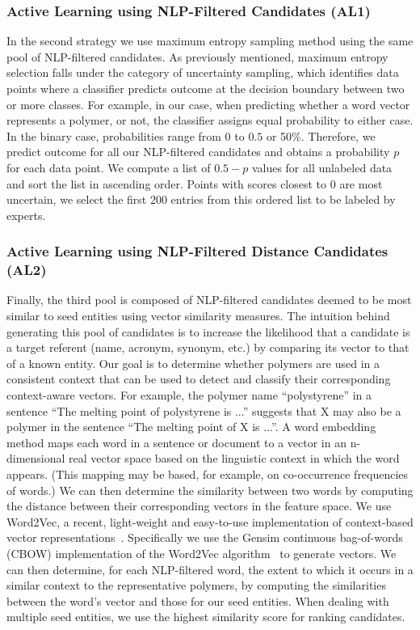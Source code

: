 \subsubsection{Active Learning using NLP-Filtered Candidates (AL1)}
In the second strategy we use maximum entropy sampling method using the same pool of NLP-filtered candidates.
As previously mentioned, maximum entropy selection falls under the category of uncertainty sampling, which identifies data points where a classifier predicts outcome at the decision boundary between two or more classes. 
For example, in our case, when predicting whether a word vector represents a polymer, or not, the classifier assigns equal probability to either case.
In the binary case, probabilities range from $0$ to $0.5$ or 50\%. Therefore, we predict outcome for all our NLP-filtered candidates and obtains a probability $p$ for each data point. We compute a list of $0.5-p$ values for all unlabeled data and sort the list in ascending order.
Points with scores closest to $0$ are most uncertain, we select the first 200 entries from this ordered list to be labeled by experts.


\subsubsection{Active Learning using NLP-Filtered Distance Candidates (AL2)}
Finally, the third pool is composed of NLP-filtered candidates deemed to be most similar to seed entities using vector similarity measures.
The intuition behind generating this pool of candidates is to increase the likelihood that a candidate is a target referent (name, acronym, synonym, etc.) by comparing its vector to that of a known entity.
Our goal is to determine whether polymers are used in a consistent context that can be used to detect and classify their corresponding context-aware vectors.
For example, the polymer name ``polystyrene'' in a sentence ``The
melting point of polystyrene is ...'' suggests that X may also be a polymer in the
sentence ``The melting point of X is ...''.
A word embedding method maps each word
in a sentence or document to a vector in an n-dimensional real vector space
based on the linguistic context in which the word appears. (This mapping may
be based, for example, on co-occurrence frequencies of words.) 
We can then
determine the similarity between two words by computing the distance between
their corresponding vectors in the feature space.
We use Word2Vec, a recent, light-weight and easy-to-use implementation of context-based vector representations~\cite{mikolov2013efficient,mikolov2013distributed}.
Specifically we use the Gensim continuous bag-of-words
(CBOW) implementation of the Word2Vec
algorithm~\cite{rehurek2010software} to generate vectors.
We can then determine, for each NLP-filtered word, the extent to which it occurs
in a similar context to the representative polymers, by computing the similarities
between the word's vector and those for our seed entities. 
When dealing with multiple seed entities, we use the highest similarity score for ranking candidates.

